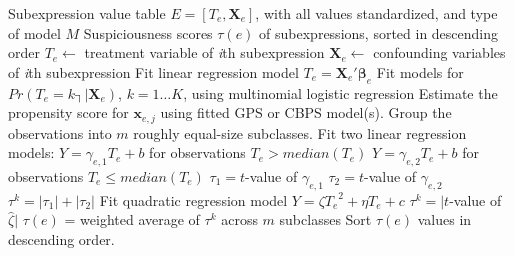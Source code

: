 \documentclass[times]{stvrauth}
\begin{document}

\renewcommand{\algorithmicrequire}{\textbf{Input:}}
\renewcommand{\algorithmicensure}{\textbf{Output:}}
\begin{algorithm}
  \label{NUMFLalg}

  \begin{algorithmic}[1]
    \Require Subexpression value table $E=[T_e, \pmb{X}_e]$, with all values standardized, and type of model $M$
    \Ensure Suspiciousness scores $\tau \left( e \right)$ of subexpressions, sorted in descending order
        \State        $T_e \gets$ treatment variable of {\it i}th subexpression
        \State        $\pmb{X}_e\gets$ confounding variables of {\it i}th subexpression
            \State Fit linear regression model ${T_e} = {\pmb{X}_e}'{\pmb{\beta} _e}$
            \State Fit models for $Pr⁡(T_e=k ┤|  \pmb{X}_e)$,
            \State$k = 1 \ldots K$, using multinomial logistic regression
        \EndIf
            \State Estimate the propensity score for ${\pmb{x}_{e,j}}$ using fitted GPS or
            \State CBPS model(s).
        \EndFor
        \State Group the observations into $m$ roughly equal-size subclasses.
                 \State Fit two linear regression models:
                 \State  $Y = {\gamma _{e,1}}{T_e} + b$   for observations $T_e>median(T_e)$
                 \State  $Y = {\gamma _{e,2}}{T_e} + b$   for observations $T_e \le median(T_e)$
                 \State  ${\tau _1} = t$-value of ${\gamma _{e,1}}$
                 \State  ${\tau _2} = t$-value of ${\gamma _{e,2}}$
                 \State ${\tau ^k} = |{\tau _1}| + |{\tau _2}|$
            \EndIf
                \State Fit quadratic regression model $Y = \zeta {T_e}^2 + \eta {T_e} + c$
                \State ${\tau ^k} = |t$-value of $\hat \zeta |$
            \EndIf
        \EndFor
        \State $\tau(e)$ = weighted average of  $\tau^k$ across $m$ subclasses
    \EndFor
    \State Sort  $\tau(e)$ values in descending order.

  \end{algorithmic}
\end{algorithm}
\end{document}
